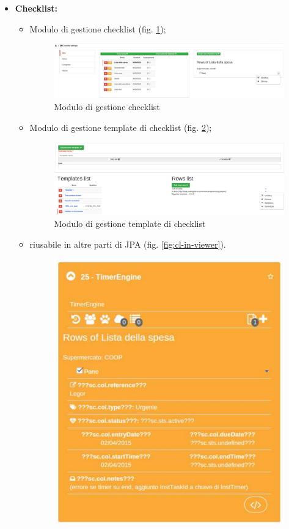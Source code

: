 \begin{itemize}
\item \textbf{Checklist:}
  \begin{itemize}
  \item Modulo di gestione checklist (fig.
    \ref{fig:gestione-checklist-screen});
    \begin{figure}[H]%
    \centering
    \includegraphics[width=1.2\columnwidth]{immagini/gestioneChecklist}
    \caption{Modulo di gestione checklist}
    \label{fig:gestione-checklist-screen}%
    \end{figure}
  \item Modulo di gestione template di checklist (fig.
    \ref{fig:gestione-tmpl-cl});
    \begin{figure}[H]%
    \centering
    \includegraphics[width=1.2\columnwidth]{immagini/clTemplate}
    \caption{Modulo di gestione template di checklist}
    \label{fig:gestione-tmpl-cl}%
    \end{figure}
  \item {} riusabile in altre parti di JPA (fig.
    \ref{fig:cl-in-viewer}).
    \begin{figure}[H]%
    \centering
    \includegraphics[width=.5\columnwidth]{immagini/taskConChecklist}

\end{figure}
\end{itemize}
\end{itemize}
